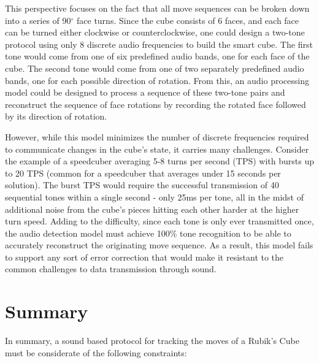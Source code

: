 This perspective focuses on the fact that all move sequences can be
broken down into a series of 90$^\circ$ face turns. Since the cube
consists of 6 faces, and each face can be turned either clockwise or
counterclockwise, one could design a two-tone protocol using only 8
discrete audio frequencies to build the smart cube. The first tone
would come from one of six predefined audio bands, one for each face of
the cube. The second tone would come from one of two separately
predefined audio bands, one for each possible direction of rotation.
From this, an audio processing model could be designed to process a
sequence of these two-tone pairs and reconstruct the sequence of face
rotations by recording the rotated face followed by its direction of
rotation.

However, while this model minimizes the number of discrete frequencies
required to communicate changes in the cube's state, it carries many
challenges. Consider the example of a speedcuber averaging 5-8 turns
per second (TPS) with bursts up to 20 TPS (common for a speedcuber that
averages under 15 seconds per solution). The burst TPS would require
the successful transmission of 40 sequential tones within a single
second - only 25ms per tone, all in the midst of additional noise from
the cube's pieces hitting each other harder at the higher turn speed.
Adding to the difficulty, since each tone is only ever transmitted
once, the audio detection model must achieve 100\% tone recognition to
be able to accurately reconstruct the originating move sequence. As a
result, this model fails to support any sort of error correction that
would make it resistant to the common challenges to data transmission
through sound.

\newpage
\section{Summary}
\label{sec:protocol-summary}

In summary, a sound based protocol for tracking the moves of a Rubik's
Cube must be considerate of the following constraints:

